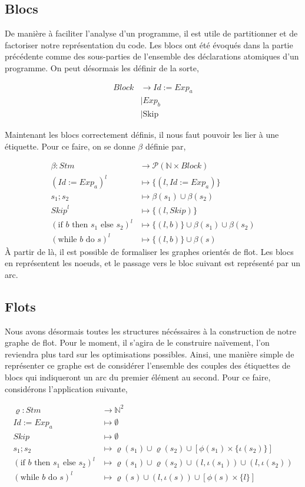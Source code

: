 \documentclass[a4paper, 12pt]{article}
\begin{document}
\subsection{Blocs}
De manière à faciliter l'analyse d'un programme, il est utile de partitionner et de factoriser notre représentation du code. 
Les blocs ont été évoqués dans la partie précédente comme des sous-parties de l'ensemble des déclarations atomiques d'un programme. 
On peut désormais les définir de la sorte,

\begin{align*}
	Block &\rightarrow Id := Exp_a\\
	&\mid Exp_b\\
	&\mid \text{Skip}
\end{align*}

Maintenant les blocs correctement définis, il nous faut pouvoir les lier à une étiquette. Pour ce faire, on se donne $\beta$ définie par,

\begin{align*}
	\beta : Stm &\longrightarrow \mathcal{P}(\mathbb{N} \times Block)\\
	(Id:=Exp_a)^l &\longmapsto \{(l, Id := Exp_a)\}\\
	s_1 ; s_2 &\longmapsto \beta(s_1) \cup \beta(s_2)\\
	\textit{Skip}^l &\longmapsto \{(l, \textit{Skip})\}\\
	(\text{if } b \text{ then }s_1\text{ else }s_2)^l &\longmapsto \{(l, b)\}\cup \beta(s_1)\cup\beta(s_2)\\
	(\text{while }b\text{ do }s)^l &\longmapsto \{(l, b)\}\cup\beta(s)
\end{align*}
À partir de là, il est possible de formaliser les graphes orientés de flot. Les blocs en représentent les noeuds, et le passage 
vers le bloc suivant est représenté par un arc.

\subsection{Flots}
Nous avons désormais toutes les structures nécéssaires à la construction de notre graphe de flot. Pour le moment, il s'agira de 
le construire naïvement, l'on reviendra plus tard sur les optimisations possibles. Ainsi, une manière simple de représenter ce 
graphe est de considérer l'ensemble des couples des étiquettes de blocs qui indiqueront un arc du premier élément au second. 
Pour ce faire, considérons l'application suivante, 

\begin{align*}
	\varrho : Stm &\longrightarrow \mathbb{N}^2 \\
	Id:=Exp_a &\longmapsto \emptyset \\
	\textit{Skip} &\longmapsto \emptyset \\
	s_1 ; s_2 &\longmapsto \varrho(s_1) \cup \varrho(s_2) \cup [\phi(s_1)\times\{\iota(s_2)\}] \\
	(\text{if }b\text{ then }s_1\text{ else }s_2)^l &\longmapsto \varrho(s_1)\cup\varrho(s_2)\cup(l, \iota(s_1))\cup(l, \iota(s_2)) \\
	(\text{while }b\text{ do }s)^l &\longmapsto \varrho(s)\cup(l,\iota(s))\cup[\phi(s)\times\{l\}]
\end{align*}
\end{document}
